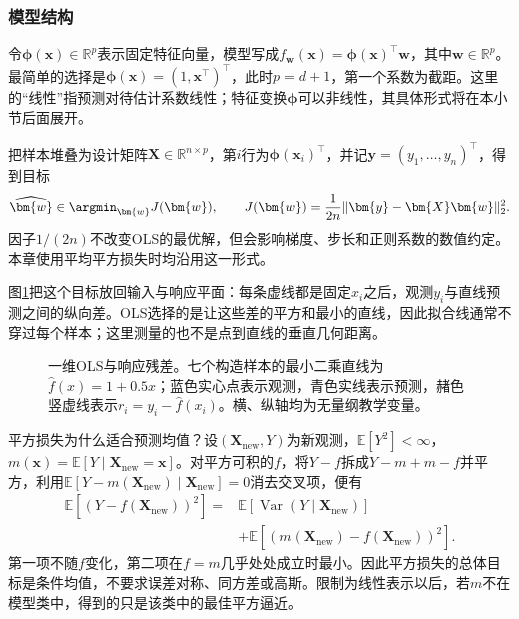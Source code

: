\subsubsection{模型结构}
\label{sec:regression-ols-structure}

令$\bm{\phi}(\bm{x})\in\mathbb{R}^{p}$表示固定特征向量，模型写成$f_{\bm{w}}(\bm{x})=\bm{\phi}(\bm{x})^{\top}\bm{w}$，其中$\bm{w}\in\mathbb{R}^{p}$。最简单的选择是$\bm{\phi}(\bm{x})=(1,\bm{x}^{\top})^{\top}$，此时$p=d+1$，第一个系数为截距。这里的“线性”指预测对待估计系数线性；特征变换$\bm{\phi}$可以非线性，其具体形式将在本小节后面展开。

把样本堆叠为设计矩阵$\bm{X}\in\mathbb{R}^{n\times p}$，第$i$行为$\bm{\phi}(\bm{x}_i)^{\top}$，并记$\bm{y}=(y_1,\ldots,y_n)^{\top}$，得到目标
\begin{equation}
  \widehat{\bm{w}}\in\argmin_{\bm{w}}J(\bm{w}),
  \qquad
  J(\bm{w})=\frac{1}{2n}\lVert\bm{y}-\bm{X}\bm{w}\rVert_2^2.
  \label{eq:regression-ols-objective}
\end{equation}
因子$1/(2n)$不改变OLS的最优解，但会影响梯度、步长和正则系数的数值约定。本章使用平均平方损失时均沿用这一形式。

图\ref{fig:regression-ols-residuals}把这个目标放回输入与响应平面：每条虚线都是固定$x_i$之后，观测$y_i$与直线预测之间的纵向差。OLS选择的是让这些差的平方和最小的直线，因此拟合线通常不穿过每个样本；这里测量的也不是点到直线的垂直几何距离。

\begin{figure}[htbp]
  \centering
  
  \caption{一维OLS与响应残差。七个构造样本的最小二乘直线为$\widehat f(x)=1+0.5x$；蓝色实心点表示观测，青色实线表示预测，赭色竖虚线表示$r_i=y_i-\widehat f(x_i)$。横、纵轴均为无量纲教学变量。}
  \label{fig:regression-ols-residuals}
\end{figure}

平方损失为什么适合预测均值？设$(\bm{X}_{\mathrm{new}},Y)$为新观测，$\mathbb{E}[Y^2]<\infty$，$m(\bm{x})=\mathbb{E}[Y\mid\bm{X}_{\mathrm{new}}=\bm{x}]$。对平方可积的$f$，将$Y-f$拆成$Y-m+m-f$并平方，利用$\mathbb{E}[Y-m(\bm{X}_{\mathrm{new}})\mid\bm{X}_{\mathrm{new}}]=0$消去交叉项，便有
\begin{equation}
  \begin{aligned}
    \mathbb{E}[(Y-f(\bm{X}_{\mathrm{new}}))^2]
    ={}&\mathbb{E}[\operatorname{Var}(Y\mid\bm{X}_{\mathrm{new}})]\\
       &+\mathbb{E}[(m(\bm{X}_{\mathrm{new}})-f(\bm{X}_{\mathrm{new}}))^2].
  \end{aligned}
  \label{eq:regression-risk-decomposition}
\end{equation}
第一项不随$f$变化，第二项在$f=m$几乎处处成立时最小。因此平方损失的总体目标是条件均值，不要求误差对称、同方差或高斯。限制为线性表示以后，若$m$不在模型类中，得到的只是该类中的最佳平方逼近。

